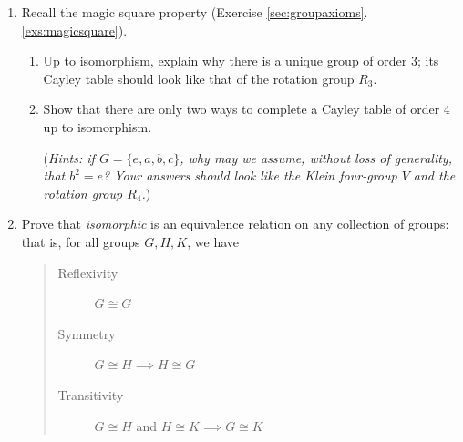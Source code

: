 \begin{exercises}{}
\begin{enumerate}
		
	
	
		\item Recall the magic square property (Exercise \ref*{sec:groupaxioms}.\ref{exs:magicsquare}).
		\begin{enumerate}
		  \item Up to isomorphism, explain why there is a unique group of order 3; its Cayley table should look like that of the rotation group $R_3$.
		  
		  \item Show that there are only two ways to complete a Cayley table of order 4 up to isomorphism.\par
			(\emph{Hints: if $G=\{e,a,b,c\}$, why may we assume, without loss of generality, that $b^2=e$? Your answers should look like the Klein four-group $V$ and the rotation group $R_4$.})
		\end{enumerate}
			
			
		\item\label{exs:isomorphiccomposition} Prove that \emph{isomorphic} is an equivalence relation on any collection of groups: that is, for all groups $G,H,K$, we have
		\begin{quote}
		\begin{description}
		  \item[\normalfont Reflexivity] $G\cong G$
		  \item[\normalfont Symmetry] $G\cong H\implies H\cong G$
		  \item[\normalfont Transitivity] $G\cong H$ and $H\cong K\implies G\cong K$
		\end{description}
		\end{quote}
		
	\end{enumerate}
\end{exercises}

